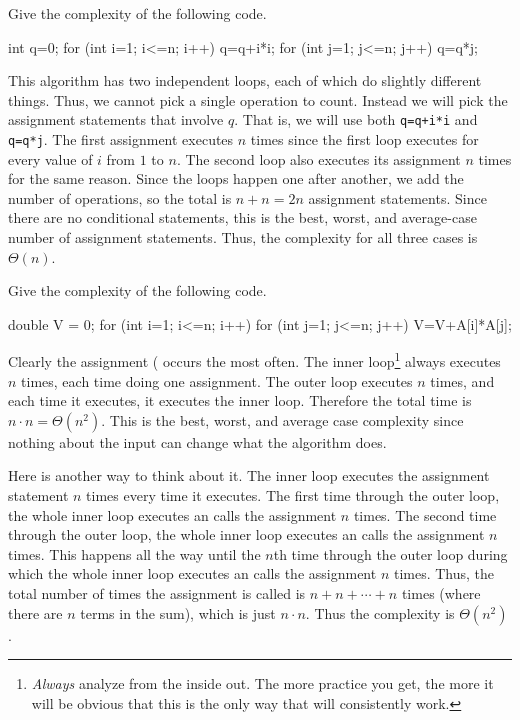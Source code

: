 \newpage

\begin{exa}\label{exa:sequentialloops}
Give the complexity of the following code.
\begin{code}
     int q=0;
     for (int i=1; i<=n; i++) { 
         q=q+i*i;
     }
     for (int j=1; j<=n; j++) {
         q=q*j;
     }
\end{code}
\begin{sol}
This algorithm has two independent loops, 
each of which do slightly different things. 
Thus, we cannot pick a single operation to count.  
Instead we will pick the assignment statements that involve $q$.
That is, we will use both \verb#q=q+i*i# and \verb+q=q*j+.
The first assignment executes $n$ times since the first loop executes for
every value of $i$ from $1$ to $n$.  The second loop also executes its assignment
$n$ times for the same reason.  Since the loops happen one after another, we
add the number of operations, so the total is $n+n=2n$ assignment statements.
Since there are no conditional statements, this is the best, worst, and
average-case number of assignment statements.  Thus, the complexity for all three
cases is $\Theta(n)$.
 
\end{sol}
\end{exa}
 

\begin{exa}\label{exa:nestedloops}
Give the complexity of the following code.
\begin{code}
    double V = 0;
     for (int i=1; i<=n; i++) { 
         for (int j=1; j<=n; j++) { 
             V=V+A[i]*A[j];
         }
     }
\end{code}
\begin{sol}
Clearly the assignment ( occurs the most often.
The inner loop\footnote{{\em Always} analyze from the inside out.  The more practice you get, the
more it will be obvious that this is the only way that will consistently work.}
always executes $n$ times, each time doing one assignment.
The outer loop executes $n$ times, and each time it executes, it executes the inner loop.
Therefore the total time is $n\cdot n=\Theta(n^2)$.  This is the best, worst, and average
case complexity since nothing about the input can change what the algorithm does.

Here is another way to think about it. 
The inner loop executes the assignment statement $n$ times every time it executes.
The first time through the outer loop, 
the whole inner loop executes an calls the assignment $n$ times.
The second time through the outer loop, 
the whole inner loop executes an calls the assignment $n$ times.
This happens all the way until the $n$th time through the outer loop during which the
whole inner loop executes an calls the assignment $n$ times.
Thus, the total number of times the assignment is called is 
$n+n+\cdots+n$ times (where there are $n$
terms in the sum), which is just $n\cdot n$.  Thus the complexity is $\Theta(n^2)$.
 
\end{sol}
\end{exa}
 
